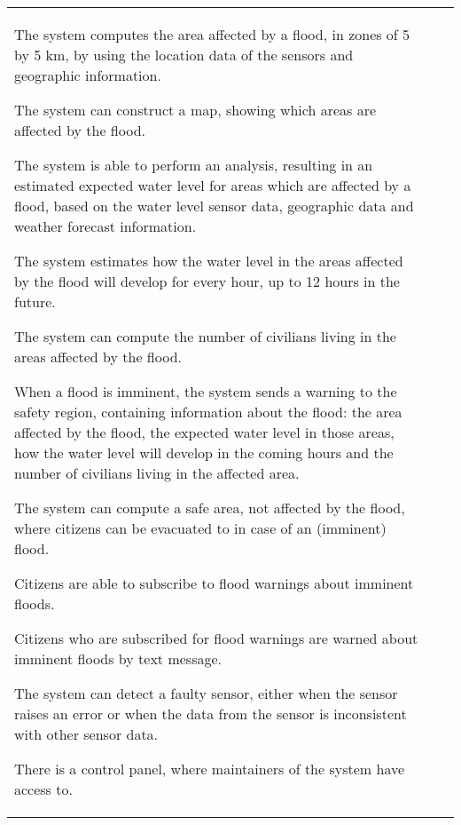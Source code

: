 \begin{longtable}{L{0.1\textwidth} L{0.12\textwidth} L{0.78\textwidth}}
    { The system computes the area affected by a flood, in zones of 5 by 5 km, by using the location data of the sensors and geographic information. }
    
    { The system can construct a map, showing which areas are affected by the flood. }
    
    { The system is able to perform an analysis, resulting in an estimated expected water level for  areas which are affected by a flood, based on the water level sensor data, geographic data and weather forecast information. }
    
    { The system estimates how the water level in the areas affected by the flood will develop for every hour, up to 12 hours in the future. } %
    
    { The system can compute the number of civilians living in the areas affected by the flood. }
    
	{ When a flood is imminent, the system sends a warning to the safety region, containing information about the flood: the area affected by the flood, the expected water level in those areas, how the water level will develop in the coming hours and the number of civilians living in the affected area. }
    
    { The system can compute a safe area, not affected by the flood, where citizens can be evacuated to in case of an (imminent) flood. }
    
    { Citizens are able to subscribe to flood warnings about imminent floods. }
    
    { Citizens who are subscribed for flood warnings are warned about imminent floods by text message. }
	
    { The system can detect a faulty sensor, either when the sensor raises an error or when the data from the sensor is inconsistent with other sensor data. }
    
    { There is a control panel, where maintainers of the system have access to. }  %
    

\end{longtable}

